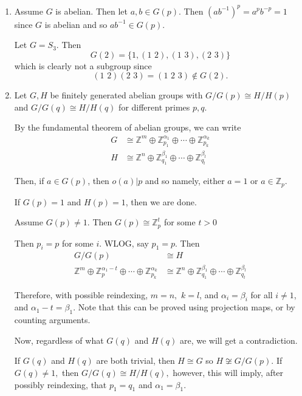 \documentclass[12pt]{AlgebraQual}
\begin{document}
\begin{solution}$\,$
\begin{enumerate}[label=(\alph*)]
    \item Assume $G$ is abelian. Then let $a,b\in G(p)$. Then $(ab^{-1})^p=a^pb^{-p}=1$ since $G$ is abelian and so $ab^{-1}\in G(p).$

    Let $G=S_3$. Then $$G(2)=\{1,(1\,\, 2),(1\,\, 3),(2\,\,3)\}$$ which is clearly not a subgroup since $$(1\,\, 2)(2\,\,3)=(1\,\,2\,\,3)\notin G(2).$$
    \item Let $G,H$ be finitely generated abelian groups with $G/G(p)\cong H/H(p)$ and $G/G(q)\cong H/H(q)$ for different primes $p,q$.

    By the fundamental theorem of abelian groups, we can write \begin{align*}
        G&\cong\mathbb{Z}^m\oplus\mathbb{Z}_{p_1}^{\alpha_1}\oplus\cdots\oplus\mathbb{Z}_{p_k}^{\alpha_k}\\
        H&\cong\mathbb{Z}^n\oplus\mathbb{Z}_{q_1}^{\beta_1}\oplus\cdots\oplus\mathbb{Z}_{q_l}^{\beta_l}
    \end{align*}

    Then, if $a\in G(p)$, then $o(a)|p$ and so namely, either $a=1$ or $a\in\mathbb{Z}_p$.

    If $G(p)=1$ and $H(p)=1$, then we are done.

    Assume $G(p)\not=1.$ Then $G(p)\cong\mathbb{Z}_p^t$ for some $t>0$

     Then $p_i=p$ for some $i$. WLOG, say $p_1=p.$ Then \begin{align*}
        G/G(p)&\cong H\\
        \mathbb{Z}^m\oplus\mathbb{Z}_{p}^{\alpha_1-t}\oplus\cdots\oplus\mathbb{Z}_{p_k}^{\alpha_k}&\cong \mathbb{Z}^n\oplus\mathbb{Z}_{q_1}^{\beta_1}\oplus\cdots\oplus\mathbb{Z}_{q_l}^{\beta_l}
    \end{align*}

    Therefore, with possible reindexing, $m=n,$ $k=l$, and $\alpha_i=\beta_i$ for all $i\not=1$, and $\alpha_1-t=\beta_1.$ Note that this can be proved using projection maps, or by counting arguments.

    Now, regardless of what $G(q)$ and $H(q)$ are, we will get a contradiction.

    If $G(q)$ and $H(q)$ are both trivial, then $H\cong G$ so $H\not\cong G/G(p).$ If $G(q)\not=1,$ then $G/G(q)\cong H/H(q),$ however, this will imply, after possibly reindexing, that $p_1=q_1$ and $\alpha_1=\beta_1.$


\end{enumerate}
\end{solution}
\end{document}
